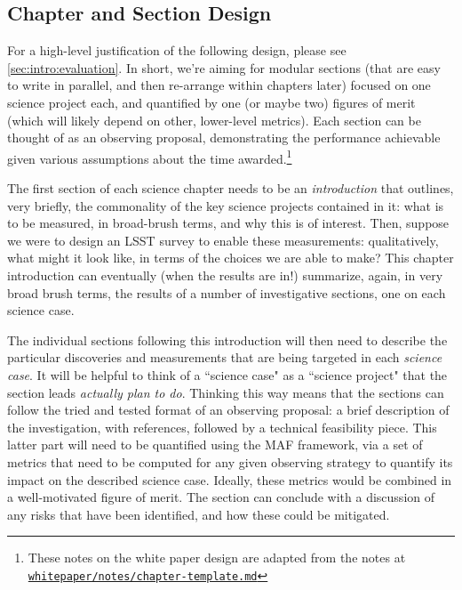 \subsection{Chapter and Section Design}

For a high-level justification of the following design, please see
\autoref{sec:intro:evaluation}. In short, we're aiming for modular
sections (that are easy to write in parallel, and then re-arrange
within chapters later) focused on one science project each, and
quantified by one (or maybe two) figures of merit (which will likely
depend on other, lower-level metrics). Each section can be thought of
as an observing proposal, demonstrating the performance achievable
given various assumptions about the time awarded.\footnote{These notes
on the white paper design are adapted from the notes at
\href{https://github.com/LSSTScienceCollaborations/ObservingStrategy/blob/master/whitepaper/notes/chapter-template.md}{\texttt{whitepaper/notes/chapter-template.md}}}


The first section of each science chapter needs to be an {\it introduction}
that outlines, very briefly, the commonality of the key science projects
contained in it:  what is to be measured, in broad-brush terms, and
why this is of interest. Then, suppose we were to design an LSST
survey to enable these measurements: qualitatively, what might it look
like, in terms of the choices we are able to make? This chapter
introduction can eventually (when the results are in!) summarize,
again, in very broad brush terms, the results of a number of
investigative sections, one on each science case.

The individual sections following this introduction will then need to
describe the particular discoveries and measurements that are being
targeted in each {\it science case}. It will be helpful to think of a
``science case" as a ``science project" that the section leads {\it
actually plan to do}. Thinking this way means that the sections can
follow the tried and tested format of an observing proposal: a brief
description of the investigation, with references, followed by a
technical feasibility piece.  This latter part will need to be
quantified using the MAF framework, via a set of metrics that need to
be computed for any given observing strategy to quantify its impact on
the described science case. Ideally, these metrics would be combined
in a well-motivated figure of merit. The section can conclude with a
discussion of any risks that have been identified, and how these could
be mitigated.

